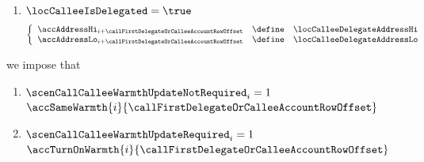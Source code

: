 \begin{description}
\begin{enumerate}
				\If   $\locCalleeIsntDelegated = \true$
				\Then $\accSameAddr {i}{\callFirstDelegateOrCalleeAccountRowOffset}{\callFirstCalleeAccountRowOffset}$
		        \item
				\If   $\locCalleeIsDelegated = \true$
				\Then
				\[
					\left\{ \begin{array}{lcl}
						\accAddressHi    _{i + \callFirstDelegateOrCalleeAccountRowOffset } & \define & \locCalleeDelegateAddressHi \\
						\accAddressLo    _{i + \callFirstDelegateOrCalleeAccountRowOffset } & \define & \locCalleeDelegateAddressLo \\
					\end{array} \right.
				\]
		\end{enumerate}
	\item[\underline{Updating the warmth of the first \delegateName{} / \calleeName{} account-row $n^°(i + \callFirstDelegateOrCalleeAccountRowOffset)$:}]
		we impose that
		\begin{enumerate}
			\item \If $\scenCallCalleeWarmthUpdateNotRequired _{i} = 1$ \Then $\accSameWarmth    {i}{\callFirstDelegateOrCalleeAccountRowOffset}$
			\item \If $\scenCallCalleeWarmthUpdateRequired    _{i} = 1$ \Then $\accTurnOnWarmth  {i}{\callFirstDelegateOrCalleeAccountRowOffset}$
		\end{enumerate}
\end{description}
